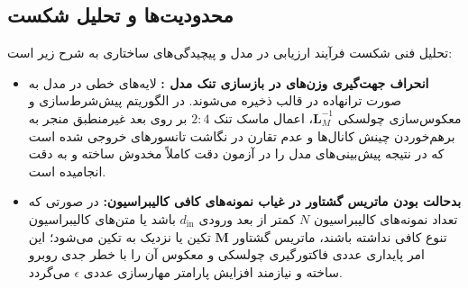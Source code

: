 \subsection{محدودیت‌ها و تحلیل شکست}
تحلیل فنی شکست فرآیند ارزیابی در مدل  و پیچیدگی‌های ساختاری  به شرح زیر است:
\begin{itemize}
    \item \textbf{انحراف جهت‌گیری وزن‌های  در بازسازی تنک مدل :} لایه‌های خطی در مدل  به صورت ترانهاده در قالب  ذخیره می‌شوند. در الگوریتم پیش‌شرط‌سازی و معکوس‌سازی چولسکی $\mathbf{L}_M^{-1}$، اعمال ماسک تنک $2:4$ بر روی بعد غیرمنطبق منجر به برهم‌خوردن چینش کانال‌ها و عدم تقارن در نگاشت تانسورهای خروجی شده است که در نتیجه پیش‌بینی‌های مدل را در آزمون دقت کاملاً مخدوش ساخته و به دقت  انجامیده است.
    \item \textbf{بدحالت بودن ماتریس گشتاور در غیاب نمونه‌های کافی کالیبراسیون:} در صورتی که تعداد نمونه‌های کالیبراسیون $N$ کمتر از بعد ورودی $d_{\text{in}}$ باشد یا متن‌های کالیبراسیون تنوع کافی نداشته باشند، ماتریس گشتاور $\mathbf{M}$ تکین یا نزدیک به تکین می‌شود؛ این امر پایداری عددی فاکتورگیری چولسکی و معکوس آن را با خطر جدی روبرو ساخته و نیازمند افزایش پارامتر مهارسازی عددی $\epsilon$ می‌گردد.
\end{itemize}
